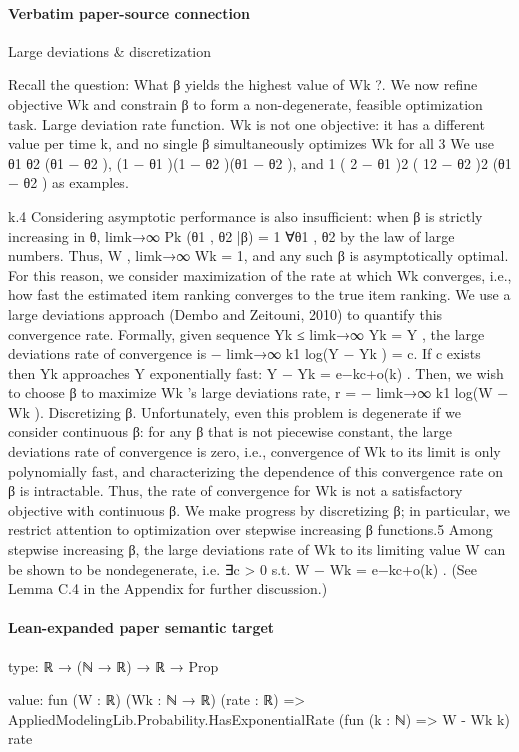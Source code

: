 \documentclass[10pt]{article}
\begin{document}
\paragraph{Verbatim paper-source connection}
\begin{ReviewVerbatim}
Large deviations & discretization

Recall the question: What β yields the highest value
of Wk ?. We now refine objective Wk and constrain β
to form a non-degenerate, feasible optimization task.
Large deviation rate function. Wk is not one
objective: it has a different value per time k, and
no single β simultaneously optimizes Wk for all
3
We use θ1 θ2 (θ1 − θ2 ), (1 − θ1 )(1 − θ2 )(θ1 − θ2 ), and
1
( 2 − θ1 )2 ( 12 − θ2 )2 (θ1 − θ2 ) as examples.

k.4 Considering asymptotic performance is also
insufficient: when β is strictly increasing in θ,
limk→∞ Pk (θ1 , θ2 |β) = 1 ∀θ1 , θ2 by the law of large
numbers. Thus, W , limk→∞ Wk = 1, and any such
β is asymptotically optimal.
For this reason, we consider maximization of the
rate at which Wk converges, i.e., how fast the estimated item ranking converges to the true item ranking. We use a large deviations approach (Dembo
and Zeitouni, 2010) to quantify this convergence
rate. Formally, given sequence Yk ≤ limk→∞ Yk =
Y , the large deviations rate of convergence is
− limk→∞ k1 log(Y − Yk ) = c. If c exists then Yk approaches Y exponentially fast: Y − Yk = e−kc+o(k) .
Then, we wish to choose β to maximize Wk ’s large
deviations rate, r = − limk→∞ k1 log(W − Wk ).
Discretizing β. Unfortunately, even this problem
is degenerate if we consider continuous β: for any β
that is not piecewise constant, the large deviations
rate of convergence is zero, i.e., convergence of Wk
to its limit is only polynomially fast, and characterizing the dependence of this convergence rate on β
is intractable. Thus, the rate of convergence for Wk
is not a satisfactory objective with continuous β.
We make progress by discretizing β; in particular,
we restrict attention to optimization over stepwise
increasing β functions.5 Among stepwise increasing
β, the large deviations rate of Wk to its limiting
value W can be shown to be nondegenerate, i.e. ∃c >
0 s.t. W − Wk = e−kc+o(k) . (See Lemma C.4 in the
Appendix for further discussion.)
\end{ReviewVerbatim}



\paragraph{Lean-expanded paper semantic target}
\begin{ReviewVerbatim}
type:
ℝ → (ℕ → ℝ) → ℝ → Prop

value:
fun (W : ℝ) (Wk : ℕ → ℝ) (rate : ℝ) => AppliedModelingLib.Probability.HasExponentialRate (fun (k : ℕ) => W - Wk k) rate
\end{ReviewVerbatim}
\end{document}

